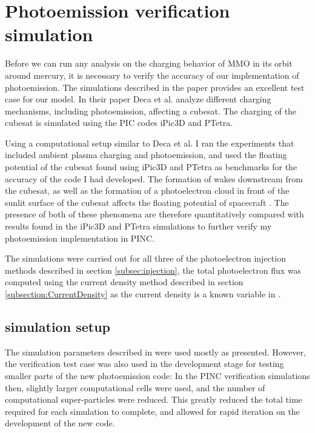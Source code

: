 \newpage
\section{Photoemission verification simulation}

Before we can run any analysis on the charging behavior of MMO in its orbit around mercury, it is necessary to verify the accuracy of our implementation of photoemission. The simulations described in the paper \parencite{Deca2013} provides an excellent test case for our model. In their paper Deca et al. analyze different charging mechanisms, including photoemission, affecting a cubesat. The charging of the cubesat is simulated using the PIC codes iPic3D and PTetra. 

Using a computational setup similar to Deca et al. I ran the experiments that included ambient plasma charging and photoemission, and used the floating potential of the cubesat found using iPic3D and PTetra as benchmarks for the accuracy of the code I had developed. The formation of wakes downstream from the cubesat, as well as the formation of a photoelectron cloud in front of the sunlit surface of the cubesat affects the floating potential of spacecraft \parencite{Miloch2015} \parencite{Sjogren2012}. The presence of both of these phenomena are therefore quantitatively compared with results found in the iPic3D and PTetra simulations to further verify my photoemission implementation in PINC.

The simulations were carried out for all three of the photoelectron injection methods described in section \ref{subsec:injection}, the total photoelectron flux was computed using the current density method described in section \ref{subsection:CurrentDensity} as the current density is a known variable in \parencite{Deca2013}.


\subsection{simulation setup}

The simulation parameters described in \parencite{Deca2013} were used mostly as presented. However, the verification test case was also used in the development stage for testing smaller parts of the new photoemission code: In the PINC verification simulations then, slightly larger computational cells were used, and the number of computational super-particles were reduced. This greatly reduced the total time required for each simulation to complete, and allowed for rapid iteration on the development of the new code. 

